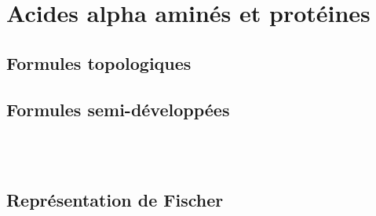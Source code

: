 \section{Acides alpha aminés et protéines}

\subsection{Formules topologiques}

\begin{boiteCodeTex}{}
  \chemfig{!\arginine}
  \chemfig{!\histidine}
  \chemfig{!\lysine}
  \chemfig{!\aspartique}
\end{boiteCodeTex}
  
\begin{boiteCodeTex}{}
  \chemfig{!\glutamique}
  \chemfig{!\serine}
  \chemfig{!\threonine}
  \chemfig{!\asparagine}
\end{boiteCodeTex}
  
\begin{boiteCodeTex}{}
  \chemfig{!\glutamine}
  \chemfig{!\cysteine}
  \chemfig{!\selenocysteine}
  \chemfig{!\glycine}
\end{boiteCodeTex}
  
\begin{boiteCodeTex}{}
  \chemfig{!\proline}
  \chemfig{!\alanine}
  \chemfig{!\valine}
  \chemfig{!\isoleucine}
  \chemfig{!\leucine}
\end{boiteCodeTex}
  
\begin{boiteCodeTex}{}
  \chemfig{!\methionine}
  \chemfig{!\phenylalanine}
  \chemfig{!\tyrosine}
  \chemfig{!\tryptophane}
\end{boiteCodeTex}

\subsection{Formules semi-développées}

\begin{boiteCodeTex}{}
  \chemfig{!\alanineSemiDev} \qq{}
  \chemfig{!\asparagineSemiDev} \qq{}
  \chemfig{!\glycineSemiDev} \\[8pt]
  \chemfig{!\cysteineSemiDev} \\[8pt]
\end{boiteCodeTex}
  
\subsection{Représentation de Fischer}

